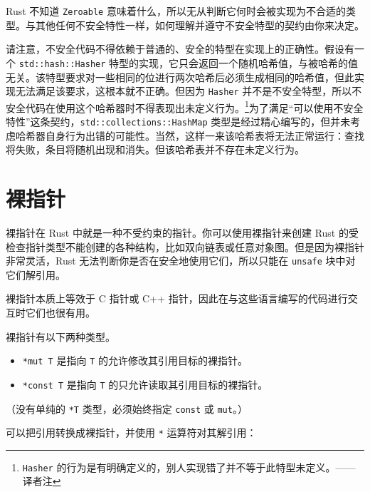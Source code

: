 Rust 不知道 \texttt{Zeroable} 意味着什么，所以无从判断它何时会被实现为不合适的类型。与其他任何不安全特性一样，如何理解并遵守不安全特型的契约由你来决定。

请注意，不安全代码不得依赖于普通的、安全的特型在实现上的正确性。假设有一个 \texttt{std::hash::Hasher} 特型的实现，它只会返回一个随机哈希值，与被哈希的值无关。该特型要求对一些相同的位进行两次哈希后必须生成相同的哈希值，但此实现无法满足该要求，这根本就不正确。但因为 \texttt{Hasher} 并不是不安全特型，所以不安全代码在使用这个哈希器时不得表现出未定义行为。\footnote{\texttt{Hasher} 的行为是有明确定义的，别人实现错了并不等于此特型未定义。——译者注}为了满足“可以使用不安全特性”这条契约，\texttt{std::collections::HashMap} 类型是经过精心编写的，但并未考虑哈希器自身行为出错的可能性。当然，这样一来该哈希表将无法正常运行：查找将失败，条目将随机出现和消失。但该哈希表并不存在未定义行为。

\section{裸指针}

裸指针在 Rust 中就是一种不受约束的指针。你可以使用裸指针来创建 Rust 的受检查指针类型不能创建的各种结构，比如双向链表或任意对象图。但是因为裸指针非常灵活，Rust 无法判断你是否在安全地使用它们，所以只能在 \texttt{unsafe} 块中对它们解引用。

裸指针本质上等效于 C 指针或 C++ 指针，因此在与这些语言编写的代码进行交互时它们也很有用。

裸指针有以下两种类型。

\begin{itemize}
\item \texttt{*mut T} 是指向 \texttt{T} 的允许修改其引用目标的裸指针。
\item \texttt{*const T} 是指向 \texttt{T} 的只允许读取其引用目标的裸指针。
\end{itemize}

（没有单纯的 \texttt{*T} 类型，必须始终指定 \texttt{const} 或 \texttt{mut}。）

可以把引用转换成裸指针，并使用 \texttt{*} 运算符对其解引用：


